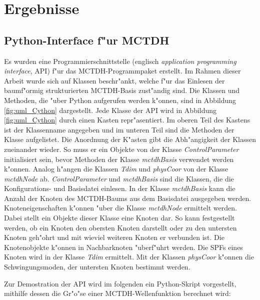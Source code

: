 \chapter{Ergebnisse}

\section{Python-Interface f"ur MCTDH}
\label{sec:PyInterface}


Es wurden eine Programmierschnittstelle (englisch \textit{application programming interface}, API) f"ur das MCTDH-Programmpaket erstellt.
Im Rahmen dieser Arbeit wurde sich auf Klassen beschr"ankt, welche f"ur das Einlesen der baumf"ormig strukturierten MCTDH-Basis zust"andig sind.
Die Klassen und Methoden, die "uber Python aufgerufen werden k"onnen, sind in Abbildung \ref{fig:uml_Cython} dargestellt. 
Jede Klasse der API wird in Abbildung \ref{fig:uml_Cython} durch einen Kasten repr"asentiert. Im oberen Teil des Kastens ist der Klassenname
angegeben und im unteren Teil sind die Methoden der Klasse aufgelistet. Die Anordnung der K"asten gibt die Abh"angigkeit der Klassen zueinander wieder.
So muss er ein Objekte von der Klasse \textit{ControlParameter} initialisiert sein, bevor Methoden der Klasse
\textit{mctdhBasis} verwendet werden k"onnen. Analog h"angen die Klassen \textit{Tdim} und \textit{physCoor} von der Klasse
\textit{mctdhNode} ab.
\textit{ControlParameter} und \textit{mctdhBasis} sind die Klassen, die die Konfigurations- und Basisdatei einlesen. 
In der Klasse \textit{mctdhBasis} kann die Anzahl der Knoten des MCTDH-Baums aus dem Basisdatei ausgegeben werden.
Knoteneigenschaften k"onnen "uber die Klasse \textit{mctdhNode}  ermittelt werden. Dabei stellt ein Objekte dieser Klasse
eine Knoten dar.
So kann festgestellt werden, ob ein Knoten den obersten Knoten darstellt oder zu den untersten Knoten geh"ohrt und mit wieviel weiteren Knoten er verbunden ist.
Die Knotenobjekte k"onnen in Nachbarknoten "uberf"uhrt werden.
Die SPFs eines Knoten wird in der Klasse \textit{Tdim} ermittelt. Mit der Klassen \textit{physCoor} k"onnen
die Schwingungsmoden, der untersten Knoten bestimmt werden. 


Zur Demostration der API wird im folgenden ein Python-Skript vorgestellt, mithilfe dessen die Gr"o"se einer MCTDH-Wellenfunktion berechnet wird:

\newpage


